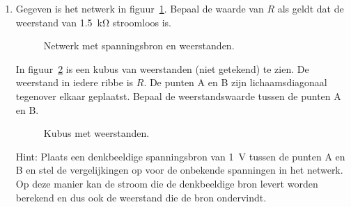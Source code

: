\begin{enumerate}[labelindent=0pt,labelwidth=\widthof{8.88.\ },label=\textbf{\thechapter.\arabic*.},leftmargin=!,ref=\thechapter.\arabic*]
\item
\label{que:gelwheatstone1}
Gegeven is het netwerk in figuur~\ref{fig:gelwheatstone1}. Bepaal de waarde van $R$ als geldt dat de weerstand van \SI{1.5}{\kilo\ohm} stroomloos is.

\begin{figure}[!ht]
\centering
{}
\caption{Netwerk met spanningsbron en weerstanden.}
\label{fig:gelwheatstone1}
\end{figure}

\itemstar
In figuur~\ref{fig:gelcube1} is een kubus van weerstanden (niet getekend) te zien. De weerstand in iedere ribbe is $R$. De punten A en B zijn lichaamsdiagonaal tegenover elkaar geplaatst. Bepaal de weerstandswaarde tussen de punten A en B.

\begin{figure}[!ht]
\centering
{}
\caption{Kubus met  weerstanden.}
\label{fig:gelcube1}
\end{figure}

Hint: Plaats een denkbeeldige spanningsbron van \SI{1}{\volt} tussen de punten A en B en stel de vergelijkingen op voor de onbekende spanningen in het netwerk. Op deze manier kan de stroom die de denkbeeldige bron levert worden berekend en dus ook de weerstand die de bron ondervindt.

\end{enumerate}
